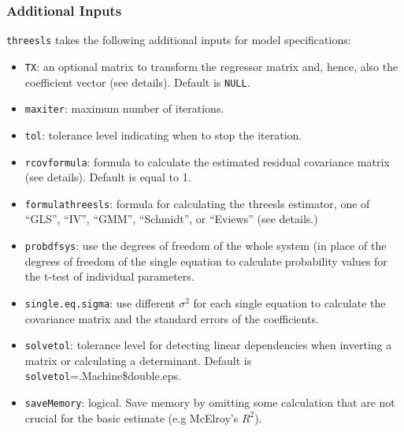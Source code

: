 \subsubsection{Additional Inputs}
\texttt{threesls} takes the following additional inputs for model
specifications:
\begin{itemize}
\item \texttt{TX}: an optional matrix to transform the regressor
matrix and, hence, also the coefficient vector (see details). Default is \texttt{NULL}.
\item \texttt{maxiter}: maximum number of iterations.
\item \texttt{tol}: tolerance level indicating when to stop the iteration.
\item \texttt{rcovformula}: formula to calculate the estimated residual covariance
matrix (see details). Default is equal to 1.
\item \texttt{formulathreesls}: formula for calculating the threesls estimator, one of ``GLS'',
``IV'', ``GMM'', ``Schmidt'', or ``Eviews'' (see details.)
\item \texttt{probdfsys}: use the degrees of freedom of the whole system
(in place of the degrees of freedom of the single equation to calculate probability
values for the t-test of individual parameters. 
\item \texttt{single.eq.sigma}: use different $\sigma^2$ for each single
equation to calculate the covariance matrix and the standard errors of the coefficients.
\item \texttt{solvetol}: tolerance level for detecting linear dependencies when 
inverting a matrix or calculating a determinant. Default is \texttt {solvetol}=.Machine\$double.eps.
\item \texttt{saveMemory}: logical. Save memory by omitting some calculation that are
not crucial for the basic estimate (e.g McElroy's $R^2$).
\end{itemize}
